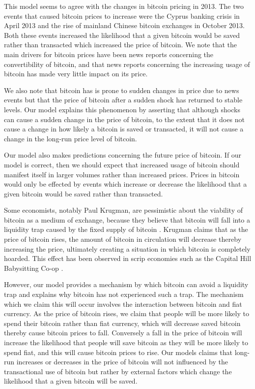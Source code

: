 \documentclass[12pt]{article}
\begin{document}
This model seems to agree with the changes in bitcoin pricing in 2013.
The two events that caused bitcoin prices to increase were the Cyprus
banking crisis in April 2013 and the rise of mainland Chinese bitcoin
exchanges in October 2013.  Both these events increased the likelihood
that a given bitcoin would be saved rather than transacted which
increased the price of bitcoin.  We note that the main drivers for
bitcoin prices have been news reports concerning the convertibility of
bitcoin, and that news reports concerning the increasing usage of
bitcoin has made very little impact on its price.

We also note that bitcoin has is prone to sudden changes in price due
to news events but that the price of bitcoin after a sudden shock has
returned to stable levels.  Our model explains this phenomenon by
asserting that although shocks can cause a sudden change in the price
of bitcoin, to the extent that it does not cause a change in how
likely a bitcoin is saved or transacted, it will not cause a change in
the long-run price level of bitcoin.

Our model also makes predictions concerning the future price of
bitcoin.  If our model is correct, then we should expect that
increased usage of bitcoin should manifest itself in larger volumes
rather than increased prices.  Prices in bitcoin would only be
effected by events which increase or decrease the likelihood that a
given bitcoin would be saved rather than transacted.

Some economists, notably Paul Krugman, are pessimistic about the
viability of bitcoin as a medium of exchange, because they believe
that bitcoin will fall into a liquidity trap caused by the fixed
supply of bitcoin \cite{krugman1}.  Krugman claims that as the price
of bitcoin rises, the amount of bitcoin in circulation will decrease
thereby increasing the price, ultimately creating a situation in
which bitcoin is completely hoarded.  This effect has been observed
in scrip economies such as the Capital Hill Babysitting Co-op 
\cite{krugman2}.

However, our model provides a mechanism by which bitcoin can avoid a
liquidity trap and explains why bitcoin has not experienced such a
trap.  The mechanism which we claim this will occur involves the
interaction between bitcoin and fiat currency.  As the price of
bitcoin rises, we claim that people will be more likely to spend their
bitcoin rather than fiat currency, which will decrease saved bitcoin
thereby cause bitcoin prices to fall.  Conversely a fall in the price
of bitcoin will increase the likelihood that people will save bitcoin
as they will be more likely to spend fiat, and this will cause bitcoin
prices to rise.  Our models claims that long-run increases or
decreases in the price of bitcoin will not influenced by the
transactional use of bitcoin but rather by external factors which
change the likelihood that a given bitcoin will be saved.
\end{document}
